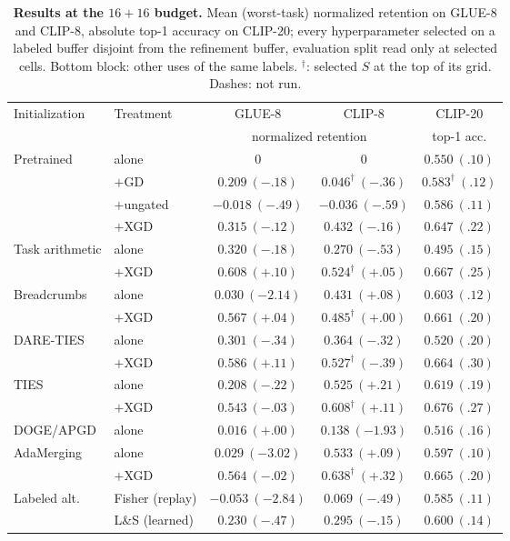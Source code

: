 \documentclass{article} %
\begin{document}
\begin{table}[t]
\centering
\scriptsize
\setlength{\tabcolsep}{3.5pt}
\caption{\textbf{Results at the $16{+}16$ budget.} Mean (worst-task) normalized retention on GLUE-8 and CLIP-8, absolute top-1 accuracy on CLIP-20; every hyperparameter selected on a labeled buffer disjoint from the refinement buffer, evaluation split read only at selected cells. Bottom block: other uses of the same labels. $^{\dagger}$: selected $S$ at the top of its grid. Dashes: not run.}
\label{tab:main16}
\renewcommand{\arraystretch}{0.95}
\begin{tabular}{llccc}
\toprule
Initialization & Treatment & GLUE-8 & CLIP-8 & CLIP-20 \\
 & & \multicolumn{2}{c}{normalized retention} & top-1 acc. \\
\midrule
Pretrained      & alone      & $0$ & $0$ & $0.550\ (.10)$ \\
                & $+$GD      & $0.209\ ({-}.18)$ & $0.046^{\dagger}\ ({-}.36)$ & $0.583^{\dagger}\ (.12)$ \\
                & $+$ungated & $-0.018\ ({-}.49)$ & $-0.036\ ({-}.59)$ & $0.586\ (.11)$ \\
                & $+$XGD     & $0.315\ ({-}.12)$ & $0.432\ ({-}.16)$ & $0.647\ (.22)$ \\
\midrule
Task arithmetic & alone      & $0.320\ ({-}.18)$ & $0.270\ ({-}.53)$ & $0.495\ (.15)$ \\
                & $+$XGD     & $\mathbf{0.608}\ ({+}.10)$ & $0.524^{\dagger}\ ({+}.05)$ & $0.667\ (.25)$ \\
\midrule
Breadcrumbs     & alone      & $0.030\ ({-}2.14)$ & $0.431\ ({+}.08)$ & $0.603\ (.12)$ \\
                & $+$XGD     & $0.567\ ({+}.04)$ & $0.485^{\dagger}\ ({+}.00)$ & $0.661\ (.20)$ \\
\midrule
DARE-TIES       & alone      & $0.301\ ({-}.34)$ & $0.364\ ({-}.32)$ & $0.520\ (.20)$ \\
                & $+$XGD     & $0.586\ ({+}.11)$ & $0.527^{\dagger}\ ({-}.39)$ & $0.664\ (.30)$ \\
\midrule
TIES            & alone      & $0.208\ ({-}.22)$ & $0.525\ ({+}.21)$ & $0.619\ (.19)$ \\
                & $+$XGD     & $0.543\ ({-}.03)$ & $0.608^{\dagger}\ ({+}.11)$ & $\mathbf{0.676}\ (.27)$ \\
\midrule
DOGE/APGD       & alone      & $0.016\ ({+}.00)$ & $0.138\ ({-}1.93)$ & $0.516\ (.16)$ \\
\midrule
AdaMerging      & alone      & $0.029\ ({-}3.02)$ & $0.533\ ({+}.09)$ & $0.597\ (.10)$ \\
                & $+$XGD     & $0.564\ ({-}.02)$ & $\mathbf{0.638}^{\dagger}\ ({+}.32)$ & $0.665\ (.20)$ \\
\midrule
Labeled alt.    & Fisher (replay)   & $-0.053\ ({-}2.84)$ & $0.069\ ({-}.49)$ & $0.585\ (.11)$ \\
                & L\&S (learned)    & $0.230\ ({-}.47)$ & $0.295\ ({-}.15)$ & $0.600\ (.14)$ \\
\bottomrule
\end{tabular}
\end{table}
\end{document}
